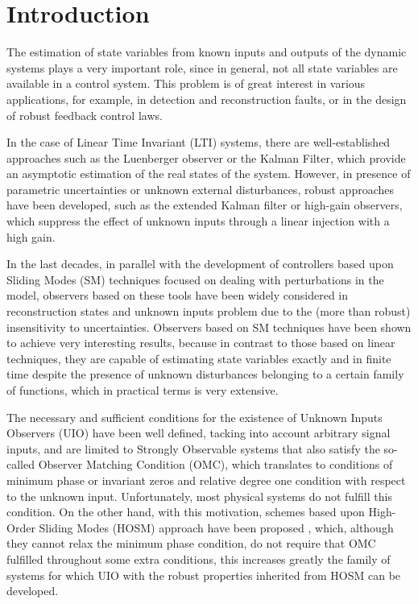 \documentclass[11pt,letterpaper,twoside,openright]{report}
\begin{document}
	\chapter{Introduction}
The estimation of state variables from known inputs and outputs of the dynamic systems plays a very important role, since in general, not all state variables are available in a control system. This problem is of great interest in various applications, for example, in detection and reconstruction faults, or in the design of robust feedback control laws.

In the case of Linear Time Invariant (LTI) systems, there are well-established approaches such as the Luenberger observer or the Kalman Filter, which provide an asymptotic estimation of the real states of the system. However, in presence of parametric uncertainties or unknown external disturbances, robust approaches have been developed, such as the extended Kalman filter or high-gain observers, which suppress the effect of unknown inputs through a linear injection with a high gain.

In the last decades, in parallel with the development of controllers based upon Sliding Modes (SM) techniques focused on dealing with perturbations in the model, observers based on these tools have been widely considered in reconstruction states and unknown inputs problem \cite{Spurgeon2008}\cite{Yan2007}\cite{Barbot2002}\cite{Boukhobza2003} due to the (more than robust) insensitivity to uncertainties\cite{Fridman2007}.
Observers based on SM techniques have been shown to achieve very interesting results, because in contrast to those based on linear techniques, they are capable of estimating state variables exactly and in finite time despite the presence of unknown disturbances  belonging to a certain family of functions, which in practical terms is very extensive.

The necessary and sufficient conditions for the existence of Unknown Inputs Observers (UIO) have been well defined, tacking into account arbitrary signal inputs, and are limited to Strongly Observable systems that also satisfy the so-called Observer Matching Condition (OMC), which translates to conditions of minimum phase or invariant zeros and relative degree one condition with respect to the unknown input\cite{Hautus1983}\cite{Fridman2007}. Unfortunately, most physical systems do not fulfill this condition. On the other hand, with this motivation, schemes based upon High-Order Sliding Modes (HOSM) approach have been proposed \cite{Fridman2007}\cite{Fridman2008}\cite{Floquet2007}\cite{Edwards2008}\cite{Fridman2011}, which, although they cannot relax the minimum phase condition, do not require that OMC fulfilled throughout some extra conditions, this increases greatly the family of systems for which UIO with the robust properties inherited from HOSM can be developed.
\end{document}
